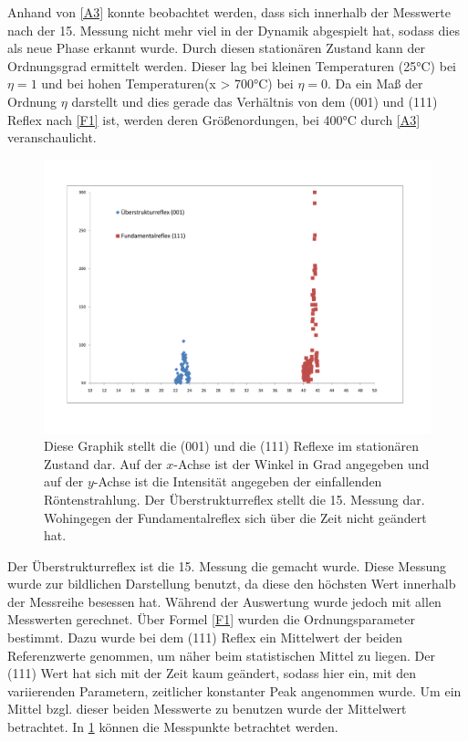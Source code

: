 \documentclass[
	a4paper,
	12pt,
	pagesize,
	ngerman
]{scrartcl}
\begin{document}
Anhand von \cref{A3} konnte beobachtet werden, dass sich innerhalb der Messwerte nach der 15. Messung nicht mehr viel in der Dynamik abgespielt hat, sodass dies als neue Phase erkannt wurde. Durch diesen stationären Zustand kann der Ordnungsgrad ermittelt werden. Dieser lag bei kleinen Temperaturen (25°C) bei $\eta = 1$ und bei hohen Temperaturen(x > 700°C) bei $\eta = 0$. Da ein Maß der Ordnung $\eta$ darstellt und dies gerade das Verhältnis von dem (001) und (111) Reflex nach \cref{F1} ist, werden deren Größenordungen, bei 400°C durch \cref{A3} veranschaulicht.
\begin{figure}[h!]
    \centering
    \includegraphics[scale = 0.5]{001 und 111.pdf}
    \caption{Diese Graphik stellt die (001) und die (111) Reflexe im stationären Zustand dar. Auf der $x$-Achse ist der Winkel in Grad angegeben und auf der $y$-Achse ist die Intensität angegeben der einfallenden Röntenstrahlung. Der Überstrukturreflex stellt die 15. Messung dar. Wohingegen der Fundamentalreflex sich über die Zeit nicht geändert hat.}
    \label{A4}
\end{figure}
Der Überstrukturreflex ist die 15. Messung die gemacht wurde. Diese Messung wurde zur bildlichen Darstellung benutzt, da diese den höchsten Wert innerhalb der Messreihe besessen hat. Während der Auswertung wurde jedoch mit allen Messwerten gerechnet.
Über Formel \cref{F1} wurden die Ordnungsparameter bestimmt. Dazu wurde bei dem (111) Reflex ein Mittelwert der beiden Referenzwerte genommen, um näher beim statistischen Mittel zu liegen. Der (111) Wert hat sich mit der Zeit kaum geändert, sodass hier ein, mit den variierenden Parametern, zeitlicher konstanter Peak angenommen wurde. Um ein Mittel bzgl. dieser beiden Messwerte zu benutzen wurde der Mittelwert betrachtet. In \cref{A4} können die Messpunkte betrachtet werden. 
\end{document}

